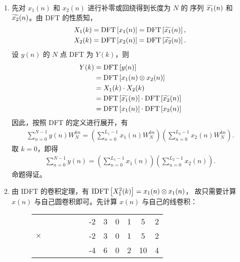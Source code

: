 \begin{solution}
    \begin{enumerate}[label=(\arabic*)]
        \item 先对 $x_1(n)$ 和 $x_2(n)$ 进行补零或回绕得到长度为 $N$ 的
            序列 $\widetilde{x_1}(n)$ 和 $\widetilde{x_2}(n)$。由 DFT 的性质知，
            \begin{align*}
                X_1(k) = \mathrm{DFT}\left[x_1(n)\right] = \mathrm{DFT}\left[\widetilde{x_1}(n)\right], \\
                X_2(k) = \mathrm{DFT}\left[x_2(n)\right] = \mathrm{DFT}\left[\widetilde{x_2}(n)\right].
            \end{align*}
            设 $y(n)$ 的 $N$ 点 DFT 为 $Y(k)$，则
            \begin{align*}
                Y(k) & = \mathrm{DFT}\left[y(n)\right] \\
                & = \mathrm{DFT}\left[x_1(n) \otimes x_2(n)\right] \\
                & = X_1(k) \cdot X_2(k) \\
                & = \mathrm{DFT}\left[\widetilde{x_1}(n)\right] \cdot \mathrm{DFT}\left[\widetilde{x_2}(n)\right] \\
                & = \mathrm{DFT}\left[x_1(n)\right] \cdot \mathrm{DFT}\left[x_2(n)\right]
            \end{align*}
            因此，按照 DFT 的定义进行展开，有
            \begin{align*}
                \sum_{n = 0}^{N - 1}y(n)W_N^{kn}
                    = \left(\sum_{n = 0}^{L_1 - 1}x_1(n)W_{N}^{kn}\right)
                    \left(\sum_{n = 0}^{L_2 - 1}x_2(n)W_{N}^{kn}\right).
            \end{align*}
            取 $k = 0$，即得
            \begin{align*}
                \sum_{n = 0}^{N - 1}y(n) = \left(\sum_{n = 0}^{L_1 - 1}x_1(n)\right)\left(\sum_{n = 0}^{L_2 - 1}x_2(n)\right).
            \end{align*}
            命题得证。
        \item 由 IDFT 的卷积定理，有 $\mathrm{IDFT}\left[X_1^2(k)\right] = x_1(n) \otimes x_1(n)$，
            故只需要计算 $x(n)$ 与自己圆卷积即可。先计算 $x(n)$ 与自己的线卷积：
            \begin{figure}[H]
                \centering
                \begin{tabular}{c c c c c c c c c c c c}
                    & & & & & & -2 & 3 & 0 & 1 & 5 & 2 \\
                    $\times$ & & &  & & & -2 & 3 & 0 & 1 & 5 & 2 \\
                    \hline
                    & & & & & & -4 & 6 & 0 & 2 & 10 & 4 \\

\end{tabular}
\end{figure}
\end{enumerate}
\end{solution}
